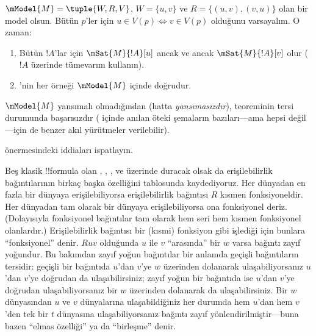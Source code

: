 \documentclass[../../../include/open-logic-section]{subfiles}
\begin{document}
\begin{prop}
  $\mModel{M}=\tuple{W,R,V}$, $W=\{u,v\}$ ve
  $R=\{(u,v),(v,u)\}$ olan bir model olsun.
  Bütün $p$'ler için $u\in V(p)\Leftrightarrow v\in V(p)$ olduğunu
  varsayalım. O zaman:
  \begin{enumerate}
  \item Bütün $!A$'lar için $\mSat{M}{!A}[u]$ ancak ve ancak
    $\mSat{M}{!A}[v]$ olur ($!A$ üzerinde tümevarım kullanın).
  \item {}'nin her örneği $\mModel{M}$ içinde doğrudur.
  \end{enumerate}
  $\mModel{M}$ yansımalı olmadığından (hatta \emph{yansımasızdır}),
   teoreminin tersi  durumunda başarısızdır
  ( içinde anılan öteki şemaların bazıları---ama
  hepsi değil---için de benzer akıl yürütmeler verilebilir).
\end{prop}

\begin{prob}
   önermesindeki iddiaları ispatlayın.
\end{prob}

Beş klasik !!{formula} olan , , ,  ve 
üzerinde duracak olsak da erişilebilirlik bağıntılarının birkaç başka
özelliğini  tablosunda kaydediyoruz. Her dünyadan en
fazla bir dünyaya erişilebiliyorsa erişilebilirlik bağıntısı $R$
kısmen fonksiyoneldir. Her dünyadan tam olarak bir dünyaya erişilebiliyorsa
ona fonksiyonel deriz. (Dolayısıyla fonksiyonel bağıntılar tam olarak hem
seri hem kısmen fonksiyonel olanlardır.) Erişilebilirlik bağıntısı bir
(kısmi) fonksiyon gibi işlediği için bunlara ``fonksiyonel'' denir. $Ruv$
olduğunda $u$ ile $v$ ``arasında'' bir $w$ varsa bağıntı zayıf yoğundur.
Bu bakımdan zayıf yoğun bağıntılar bir anlamda geçişli bağıntıların tersidir:
geçişli bir bağıntıda $u$'dan $v$'ye $w$ üzerinden dolanarak
ulaşabiliyorsanız $u$'dan $v$'ye doğrudan da ulaşabilirsiniz; zayıf yoğun
bir bağıntıda ise $u$'dan $v$'ye doğrudan ulaşabiliyorsanız bir $w$
üzerinden dolanarak da ulaşabilirsiniz. Bir $w$ dünyasından $u$ ve $v$
dünyalarına ulaşabildiğiniz her durumda hem $u$'dan hem $v$'den tek bir $t$
dünyasına ulaşabiliyorsanız bağıntı zayıf yönlendirilmiştir---buna bazen
``elmas özelliği'' ya da ``birleşme'' denir.
\end{document}
